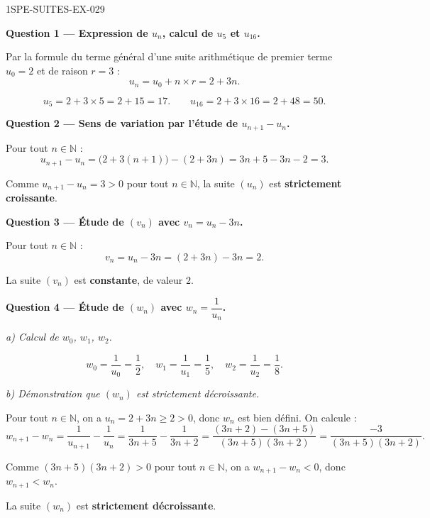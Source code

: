 \begin{corrige}{1SPE-SUITES-EX-029}

\textbf{Question 1 — Expression de $u_n$, calcul de $u_5$ et $u_{16}$.}

Par la formule du terme général d'une suite arithmétique de premier terme $u_0 = 2$ et de raison $r = 3$ :
\[
  u_n = u_0 + n \times r = 2 + 3n.
\]

\[
  u_5 = 2 + 3 \times 5 = 2 + 15 = 17. \qquad u_{16} = 2 + 3 \times 16 = 2 + 48 = 50.
\]

\medskip
\textbf{Question 2 — Sens de variation par l'étude de $u_{n+1} - u_n$.}

Pour tout $n \in \mathbb{N}$ :
\[
  u_{n+1} - u_n = \bigl(2 + 3(n+1)\bigr) - (2 + 3n) = 3n + 5 - 3n - 2 = 3.
\]


Comme $u_{n+1} - u_n = 3 > 0$ pour tout $n \in \mathbb{N}$, la suite $(u_n)$ est \textbf{strictement croissante}.

\medskip
\textbf{Question 3 — Étude de $(v_n)$ avec $v_n = u_n - 3n$.}

Pour tout $n \in \mathbb{N}$ :
\[
  v_n = u_n - 3n = (2 + 3n) - 3n = 2.
\]


La suite $(v_n)$ est \textbf{constante}, de valeur $2$.

\medskip
\textbf{Question 4 — Étude de $(w_n)$ avec $w_n = \dfrac{1}{u_n}$.}

\textit{a) Calcul de $w_0$, $w_1$, $w_2$.}

\[
  w_0 = \frac{1}{u_0} = \frac{1}{2}, \quad w_1 = \frac{1}{u_1} = \frac{1}{5}, \quad w_2 = \frac{1}{u_2} = \frac{1}{8}.
\]

\textit{b) Démonstration que $(w_n)$ est strictement décroissante.}

Pour tout $n \in \mathbb{N}$, on a $u_n = 2 + 3n \geq 2 > 0$, donc $w_n$ est bien défini. On calcule :
\[
  w_{n+1} - w_n = \frac{1}{u_{n+1}} - \frac{1}{u_n} = \frac{1}{3n+5} - \frac{1}{3n+2} = \frac{(3n+2) - (3n+5)}{(3n+5)(3n+2)} = \frac{-3}{(3n+5)(3n+2)}.
\]


Comme $(3n+5)(3n+2) > 0$ pour tout $n \in \mathbb{N}$, on a $w_{n+1} - w_n < 0$, donc $w_{n+1} < w_n$.

La suite $(w_n)$ est \textbf{strictement décroissante}.

\end{corrige}
